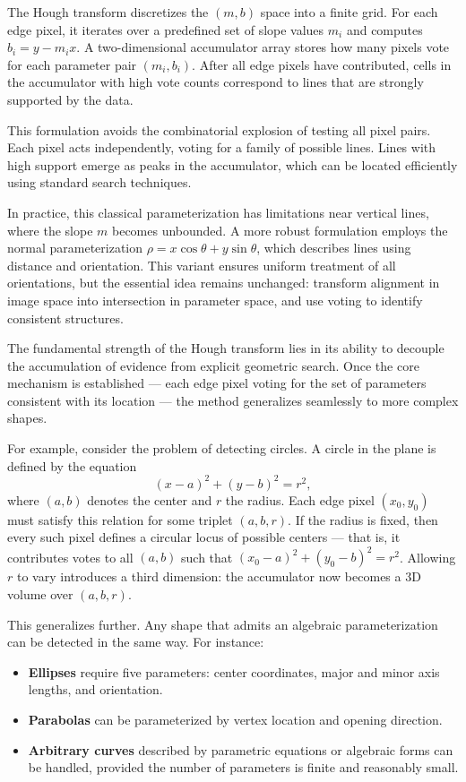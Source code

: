 The Hough transform discretizes the $(m, b)$ space into a finite grid. For each edge pixel, it iterates over a predefined set of slope values $m_i$ and computes $b_i = y - m_i x$. A two-dimensional accumulator array stores how many pixels vote for each parameter pair $(m_i, b_i)$. After all edge pixels have contributed, cells in the accumulator with high vote counts correspond to lines that are strongly supported by the data.

This formulation avoids the combinatorial explosion of testing all pixel pairs. Each pixel acts independently, voting for a family of possible lines. Lines with high support emerge as peaks in the accumulator, which can be located efficiently using standard search techniques.

In practice, this classical parameterization has limitations near vertical lines, where the slope $m$ becomes unbounded. A more robust formulation employs the normal parameterization $\rho = x\cos\theta + y\sin\theta$, which describes lines using distance and orientation. This variant ensures uniform treatment of all orientations, but the essential idea remains unchanged: transform alignment in image space into intersection in parameter space, and use voting to identify consistent structures.

The fundamental strength of the Hough transform lies in its ability to decouple the accumulation of evidence from explicit geometric search. Once the core mechanism is established — each edge pixel voting for the set of parameters consistent with its location — the method generalizes seamlessly to more complex shapes.

For example, consider the problem of detecting circles. A circle in the plane is defined by the equation
\[
(x - a)^2 + (y - b)^2 = r^2,
\]
where $(a, b)$ denotes the center and $r$ the radius. Each edge pixel $(x_0, y_0)$ must satisfy this relation for some triplet $(a, b, r)$. If the radius is fixed, then every such pixel defines a circular locus of possible centers — that is, it contributes votes to all $(a, b)$ such that $(x_0 - a)^2 + (y_0 - b)^2 = r^2$. Allowing $r$ to vary introduces a third dimension: the accumulator now becomes a 3D volume over $(a, b, r)$.

This generalizes further. Any shape that admits an algebraic parameterization can be detected in the same way. For instance:

\begin{itemize}
  \item \textbf{Ellipses} require five parameters: center coordinates, major and minor axis lengths, and orientation.
  \item \textbf{Parabolas} can be parameterized by vertex location and opening direction.
  \item \textbf{Arbitrary curves} described by parametric equations or algebraic forms can be handled, provided the number of parameters is finite and reasonably small.
\end{itemize}

